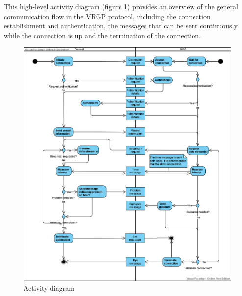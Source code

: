 This high-level activity diagram (figure \ref{fig:activity-diagram}) provides an overview of the general communication flow in the VRGP protocol, including the connection establishment and authentication, the messages that can be sent continuously while the connection is up and the termination of the connection.

\begin{figure}[ht]
	\centering
	\includegraphics[width=\linewidth]{diagrams/activity-diagram}
	\caption{Activity diagram}
	\label{fig:activity-diagram}
\end{figure}
